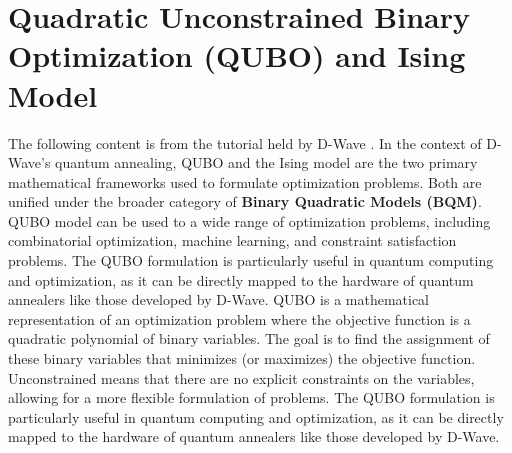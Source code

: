 \section{Quadratic Unconstrained Binary Optimization (QUBO) and Ising Model}
The following content is from the tutorial held by D-Wave \cite{DWAVE_Tutorial}. In the context of D-Wave's quantum annealing, QUBO and the Ising model are the two primary mathematical frameworks used to formulate optimization problems. Both are unified under the broader category of \textbf{Binary Quadratic Models (BQM)}.
QUBO model can be used to a wide range of optimization problems, including combinatorial optimization, machine learning, and constraint satisfaction problems. The QUBO formulation is particularly useful in quantum computing and optimization, as it can be directly mapped to the hardware of quantum annealers like those developed by D-Wave.
QUBO is a mathematical representation of an optimization problem where the objective function is a quadratic polynomial of binary variables. The goal is to find the assignment of these binary variables that minimizes (or maximizes) the objective function. 
Unconstrained means that there are no explicit constraints on the variables, allowing for a more flexible formulation of problems. The QUBO formulation is particularly useful in quantum computing and optimization, as it can be directly mapped to the hardware of quantum annealers like those developed by D-Wave.
